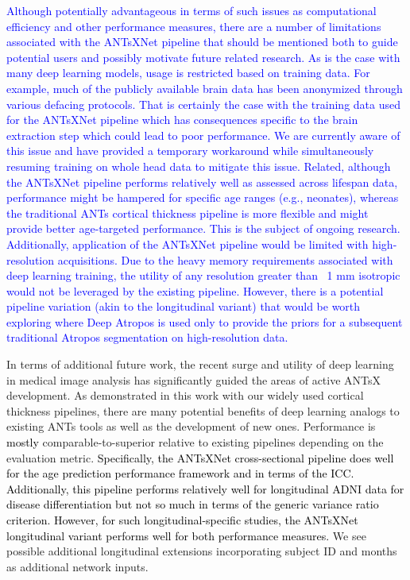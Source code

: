 \documentclass[
  12pt,
]{article}
\begin{document}
\textcolor{blue}{
Although potentially advantageous in terms of such issues as computational
efficiency and other performance measures, there are a number of limitations
associated with the ANTsXNet pipeline that should be mentioned both to guide
potential users and possibly motivate future related research.  As is the
case with many deep learning models, usage is restricted based on training
data.  For example, much of the publicly available brain data has been
anonymized through various defacing protocols.  That is certainly the case
with the training data used for the ANTsXNet pipeline which has consequences
specific to the brain extraction step which could lead to poor performance.
We are currently aware of this issue and have provided a temporary workaround
while simultaneously resuming training on whole head data to mitigate this issue.
Related, although the ANTsXNet pipeline performs relatively well as assessed
across lifespan data, performance might be hampered for specific age ranges
(e.g., neonates), whereas the traditional ANTs cortical thickness pipeline
is more flexible and might provide better age-targeted performance.  This is the subject
of ongoing research.  Additionally, application of the ANTsXNet pipeline would
be limited with high-resolution acquisitions.  Due to the heavy memory
requirements associated with deep learning training, the utility of any
resolution greater than ~1 mm isotropic would not be leveraged by the
existing pipeline.  However, there is a potential pipeline variation (akin
to the longitudinal variant) that would be worth exploring where Deep Atropos
is used only to provide the priors for a subsequent traditional Atropos
segmentation on high-resolution data.}

In terms of additional future work, the recent surge and utility of deep
learning in medical image analysis has significantly guided the areas of
active ANTsX development. As demonstrated in this work with our widely
used cortical thickness pipelines, there are many potential benefits of
deep learning analogs to existing ANTs tools as well as the development
of new ones. Performance is \textcolor{black}{mostly}
comparable-to-superior relative to existing pipelines depending on the
evaluation metric. \textcolor{black}{Specifically, the ANTsXNet
cross-sectional pipeline does well for the age prediction performance framework
and in terms of the ICC.  Additionally, this pipeline performs relatively well
for longitudinal ADNI data for disease differentiation but not so much in terms
of the generic variance ratio criterion.  However, for such longitudinal-specific
studies, the ANTsXNet longitudinal variant performs well for both performance
measures.} We see possible additional longitudinal extensions
incorporating subject ID and months as additional network inputs.
\end{document}
